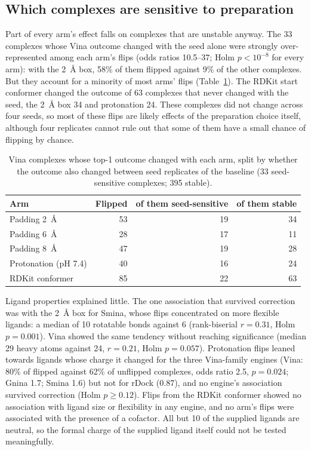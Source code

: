 \subsection{Which complexes are sensitive to preparation}

Part of every arm's effect falls on complexes that are unstable anyway. The 33 complexes
whose Vina outcome changed with the seed alone were strongly over-represented among each
arm's flips (odds ratios 10.5--37; Holm $p < 10^{-8}$ for every arm): with the
\SI{2}{\angstrom} box, 58\% of them flipped against 9\% of the other complexes. But they
account for a minority of most arms' flips (Table~\ref{tab:stable-flips}). The RDKit start
conformer changed the outcome of 63 complexes that never changed with the seed, the
\SI{2}{\angstrom} box 34 and protonation 24. These complexes did not change across four
seeds, so most of these flips are likely effects of the preparation choice itself, although
four replicates cannot rule out that some of them have a small chance of flipping by
chance.

\begin{table}[h]
  \centering
  \caption{Vina complexes whose top-1 outcome changed with each arm, split by whether
    the outcome also changed between seed replicates of the baseline (33 seed-sensitive
    complexes; 395 stable).}
  \label{tab:stable-flips}
  \begin{tabular}{lrrr}
    \toprule
    Arm & Flipped & of them seed-sensitive & of them stable \\
    \midrule
    Padding \SI{2}{\angstrom} & 53 & 19 & 34 \\
    Padding \SI{6}{\angstrom} & 28 & 17 & 11 \\
    Padding \SI{8}{\angstrom} & 47 & 19 & 28 \\
    Protonation (pH 7.4) & 40 & 16 & 24 \\
    RDKit conformer & 85 & 22 & 63 \\
    \bottomrule
  \end{tabular}
\end{table}

Ligand properties explained little. The one association that survived correction was with
the \SI{2}{\angstrom} box for Smina, whose flips concentrated on more flexible ligands: a
median of 10 rotatable bonds against 6 (rank-biserial $r = 0.31$, Holm $p = 0.001$). Vina
showed the same tendency without reaching significance (median 29 heavy atoms against 24,
$r = 0.21$, Holm $p = 0.057$). Protonation flips leaned towards ligands whose charge it
changed for the three Vina-family engines (Vina: 80\% of flipped against 62\% of unflipped
complexes, odds ratio 2.5, $p = 0.024$; Gnina 1.7; Smina 1.6) but not for rDock (0.87),
and no engine's association survived correction (Holm $p \ge 0.12$). Flips from the RDKit conformer showed no association with ligand size
or flexibility in any engine, and no arm's flips were associated with the presence of a
cofactor. All but 10 of the supplied ligands are neutral, so the formal charge of the
supplied ligand itself could not be tested meaningfully.

